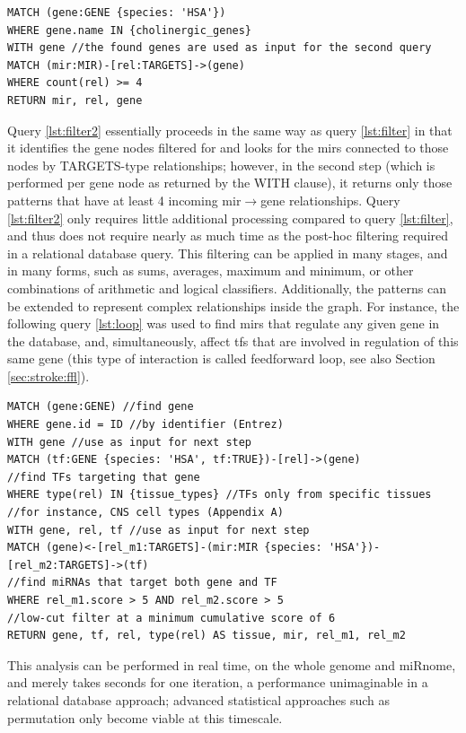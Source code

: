 \begin{lstlisting}[label=lst:filter2,caption=Two-stage Filtering,
language=Cypher]
MATCH (gene:GENE {species: 'HSA'})
WHERE gene.name IN {cholinergic_genes}
WITH gene //the found genes are used as input for the second query
MATCH (mir:MIR)-[rel:TARGETS]->(gene)
WHERE count(rel) >= 4
RETURN mir, rel, gene
\end{lstlisting}

Query \ref{lst:filter2} essentially proceeds in the same way as query \ref{lst:filter} in that it identifies the gene nodes filtered for and looks for the \acp{mir} connected to those nodes by TARGETS-type relationships; however, in the second step (which is performed per gene node as returned by the \textcolor{dkblue}{WITH} clause), it returns only those patterns that have at least 4 incoming \ac{mir}$\to$gene relationships. Query \ref{lst:filter2} only requires little additional processing compared to query \ref{lst:filter}, and thus does not require nearly as much time as the post-hoc filtering required in a relational database query. This filtering can be applied in many stages, and in many forms, such as sums, averages, maximum and minimum, or other combinations of arithmetic and logical classifiers. Additionally, the patterns can be extended to represent complex relationships inside the graph. For instance, the following query \ref{lst:loop} was used to find \acp{mir} that regulate any given gene in the database, and, simultaneously, affect \acp{tf} that are involved in regulation of this same gene (this type of interaction is called feedforward loop, see also Section \ref{sec:stroke:ffl}).

\begin{lstlisting}[label=lst:loop,
caption=Feedforward Loop Identification,
language=Cypher]
MATCH (gene:GENE) //find gene
WHERE gene.id = ID //by identifier (Entrez)
WITH gene //use as input for next step
MATCH (tf:GENE {species: 'HSA', tf:TRUE})-[rel]->(gene) 
//find TFs targeting that gene
WHERE type(rel) IN {tissue_types} //TFs only from specific tissues
//for instance, CNS cell types (Appendix A)
WITH gene, rel, tf //use as input for next step
MATCH (gene)<-[rel_m1:TARGETS]-(mir:MIR {species: 'HSA'})-[rel_m2:TARGETS]->(tf) 
//find miRNAs that target both gene and TF
WHERE rel_m1.score > 5 AND rel_m2.score > 5 
//low-cut filter at a minimum cumulative score of 6
RETURN gene, tf, rel, type(rel) AS tissue, mir, rel_m1, rel_m2
\end{lstlisting}

This analysis can be performed in real time, on the whole genome and miRnome, and merely takes seconds for one iteration, a performance unimaginable in a relational database approach; advanced statistical approaches such as permutation only become viable at this timescale.

